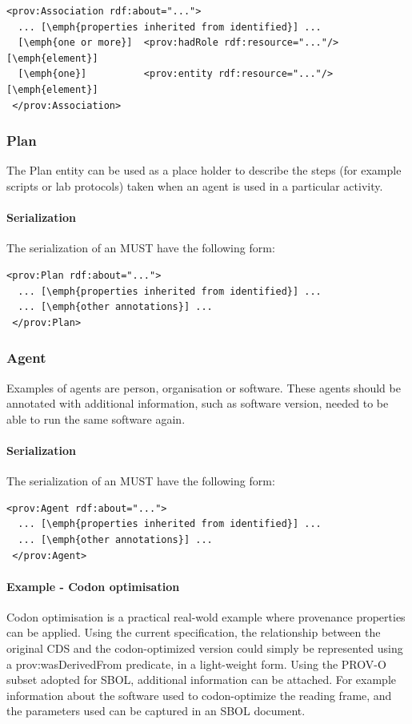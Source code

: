 \begin{lstlisting}
<prov:Association rdf:about="...">
  ... [\emph{properties inherited from identified}] ...
  [\emph{one or more}]  <prov:hadRole rdf:resource="..."/> [\emph{element}]
  [\emph{one}]          <prov:entity rdf:resource="..."/> [\emph{element}]
 </prov:Association>
\end{lstlisting}

\subsubsection{Plan}
\label{sec:Plan}
The Plan entity can be used as a place holder to describe the steps (for example scripts or lab protocols) taken when an agent is used in a particular activity. 

\paragraph{Serialization}
The serialization of an  MUST have the following form:

\begin{lstlisting}
<prov:Plan rdf:about="...">
  ... [\emph{properties inherited from identified}] ...
  ... [\emph{other annotations}] ...
 </prov:Plan>
\end{lstlisting}

\subsubsection{Agent}
\label{sec:Agent}
Examples of agents are person, organisation or software. These agents should be annotated with additional information, such as software version, needed to be able to run the same software again.

\paragraph{Serialization}
The serialization of an  MUST have the following form:

\begin{lstlisting}
<prov:Agent rdf:about="...">
  ... [\emph{properties inherited from identified}] ...
  ... [\emph{other annotations}] ...
 </prov:Agent>
\end{lstlisting}



\paragraph{Example - Codon optimisation}
Codon optimisation is a practical real-wold example where provenance properties can be applied. Using the current specification, the relationship between the original CDS and the codon-optimized version could simply be represented using a prov:wasDerivedFrom predicate, in a light-weight form. Using the PROV-O subset adopted for SBOL, additional information can be attached. For example information about the software used to codon-optimize the reading frame, and the parameters used can be captured in an SBOL document.

